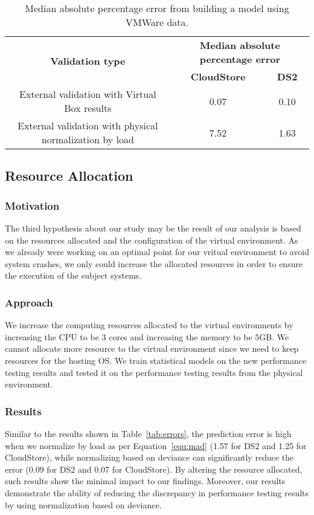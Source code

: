 \begin{table}[tbh]
	\centering
	\caption{Median absolute percentage error from building a model using VMWare data.}
	\label{tab:vmware}
		\begin{tabular}{|c||c|c|}
			\hline
			\multirow{2}{*}{\textbf{Validation type}} & \multicolumn{2}{c|}{\textbf{Median absolute percentage error}} \\ \cline{2-3} 
			& \textbf{CloudStore} & \textbf{DS2} \\ %
			\midrule
			\midrule
			External validation with Virtual Box results& 0.07&0.10\\ \hline
			External validation with physical normalization by load & 7.52& 1.63 \\ \hline
		\end{tabular}
\end{table}

\subsection{Resource Allocation}


\subsubsection{Motivation}

The third hypothesis about our study may be the result of our analysis is based on the resources allocated and the configuration of the virtual environment. As we already were working on an optimal point for our vritual environment to avoid system crashes, we only could increase the allocated resources in order to ensure the execution of the subject systems.


\subsubsection{Approach}
We increase the computing resources allocated to the virtual environments by increasing the CPU to be 3 cores and increasing the memory to be 5GB. We cannot allocate more resource to the virtual environment since we need to keep resources for the hosting OS. We train statistical models on the new performance testing results and tested it on the performance testing results from the physical environment. 


\subsubsection{Results}
Similar to the results shown in Table~\ref{tab:errors}, the prediction error is high when we normalize by load as per Equation~\ref{equ:mad} (1.57 for DS2 and 1.25 for CloudStore), while normalizing based on deviance can significantly reduce the error (0.09 for DS2 and 0.07 for CloudStore). By altering the resource allocated, such results show the minimal impact to our findings. Moreover, our results demonstrate the ability of reducing the discrepancy in performance testing results by using normalization based on deviance. 

